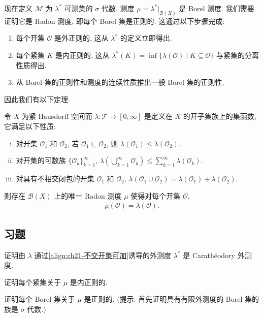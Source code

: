 \documentclass[../../main.tex]{subfiles}
\begin{document}
现在定义 $\mathcal{M}$ 为 $\lambda^{*}$ 可测集的 $\sigma$ 代数. 测度 $\mu=\lambda^{*}|_{\mathcal{B}(X)}$ 是 Borel 测度. 我们需要证明它是 Radon 测度, 即每个 Borel 集是正则的. 这通过以下步骤完成:
\begin{enumerate}[(1)]
\item 每个开集 $\mathcal{O}$ 是外正则的, 这从 $\lambda^{*}$ 的定义立即得出.
\item 每个紧集 $K$ 是内正则的, 这从 $\lambda^{*}(K)=\inf\{\lambda(\mathcal{O})\mid K\subseteq\mathcal{O}\}$ 与紧集的分离性质得出.
\item 从 Borel 集的正则性和测度的连续性质推出一般 Borel 集的正则性.
\end{enumerate}

因此我们有以下定理.

\begin{theorem}\label{theorem:ch21-radon构造}
令 $X$ 为紧 Hausdorff 空间而 $\lambda:\mathcal{T}\to[0,\infty]$ 是定义在 $X$ 的开子集族上的集函数, 它满足以下性质:
\begin{enumerate}[(i)]
\item 对开集 $\mathcal{O}_{1}$ 和 $\mathcal{O}_{2}$, 若 $\mathcal{O}_{1}\subseteq\mathcal{O}_{2}$, 则 $\lambda(\mathcal{O}_{1})\leqslant\lambda(\mathcal{O}_{2})$.
\item 对开集的可数族 $\{\mathcal{O}_{k}\}_{k=1}^{\infty}$, $\lambda\left(\bigcup_{k=1}^{\infty}\mathcal{O}_{k}\right)\leqslant\sum_{k=1}^{\infty}\lambda(\mathcal{O}_{k})$.
\item 对具有不相交闭包的开集 $\mathcal{O}_{1}$ 和 $\mathcal{O}_{2}$, $\lambda(\mathcal{O}_{1}\cup\mathcal{O}_{2})=\lambda(\mathcal{O}_{1})+\lambda(\mathcal{O}_{2})$.
\end{enumerate}
则存在 $\mathcal{B}(X)$ 上的唯一 Radon 测度 $\mu$ 使得对每个开集 $\mathcal{O}$,
\begin{align*}
\mu(\mathcal{O})=\lambda(\mathcal{O}).
\end{align*}
\end{theorem}

\subsection*{习题}

\begin{exercise}\label{exercise:ch21-25}
证明由 $\lambda$ 通过\eqref{align:ch21-不交开集可加}诱导的外测度 $\lambda^{*}$ 是 Carath\'eodory 外测度.
\end{exercise}

\begin{exercise}\label{exercise:ch21-26}
证明每个紧集关于 $\mu$ 是内正则的.
\end{exercise}

\begin{exercise}\label{exercise:ch21-27}
证明每个 Borel 集关于 $\mu$ 是正则的. (提示: 首先证明具有有限外测度的 Borel 集的族是 $\sigma$ 代数.)
\end{exercise}
\end{document}
